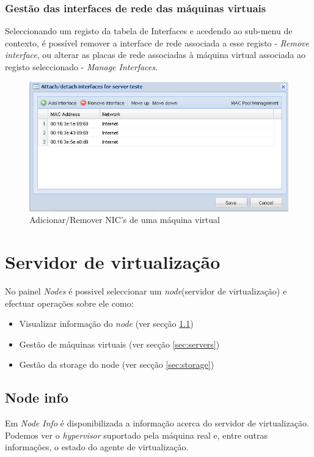 \subsubsection{Gestão das interfaces de rede das máquinas virtuais}
Seleccionando um registo da tabela de Interfaces e acedendo ao sub-menu de contexto, é possível remover a interface de rede associada a esse registo - \emph{Remove interface}, ou alterar as placas de rede associadas à máquina virtual associada ao registo seleccionado - \emph{Manage Interfaces}.

\begin{figure}[H]
	\begin{center}
	\includegraphics[scale=0.5]{screenshots/nics.png}
	\caption{Adicionar/Remover NIC's de uma máquina virtual}
	\label{fig:nics}
	\end{center}
\end{figure}


\section{Servidor de virtualização}
\label{sec:node}

No painel \emph{Nodes} é possivel seleccionar um \emph{node}(servidor de virtualização) e efectuar operações sobre ele como:
\begin{itemize}
    \item Visualizar informação do \emph{node} (ver secção \ref{sec:nodeinfo})
    \item Gestão de máquinas virtuais (ver secção \ref{sec:servers})
    \item Gestão da storage do node (ver secção \ref{sec:storage})
\end{itemize}

\subsection{Node info}
\label{sec:nodeinfo}
Em \emph{Node Info} é disponibilizada a informação acerca do servidor de virtualização. Podemos ver o \emph{hypervisor} suportado pela máquina real e, entre outras informações, o estado do agente de virtualização.

